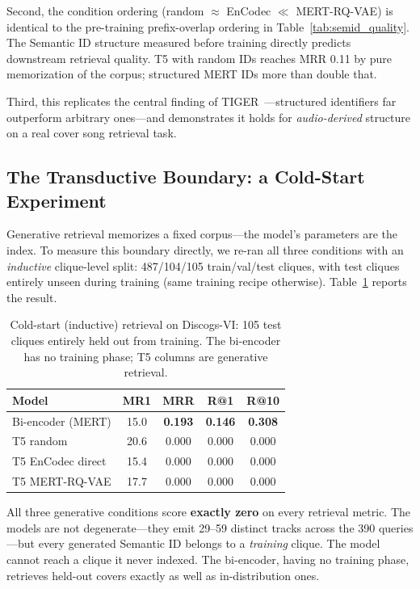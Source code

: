 \documentclass[conference]{IEEEtran}
\begin{document}
Second, the condition ordering (random $\approx$ EnCodec $\ll$ MERT-RQ-VAE) is identical to the pre-training prefix-overlap ordering in Table~\ref{tab:semid_quality}. The Semantic ID structure measured before training directly predicts downstream retrieval quality. T5 with random IDs reaches MRR 0.11 by pure memorization of the corpus; structured MERT IDs more than double that.

Third, this replicates the central finding of TIGER~\cite{rajput2023tiger}---structured identifiers far outperform arbitrary ones---and demonstrates it holds for \emph{audio-derived} structure on a real cover song retrieval task.

\subsection{The Transductive Boundary: a Cold-Start Experiment}
Generative retrieval memorizes a fixed corpus---the model's parameters are the index. To measure this boundary directly, we re-ran all three conditions with an \emph{inductive} clique-level split: 487/104/105 train/val/test cliques, with test cliques entirely unseen during training (same training recipe otherwise). Table~\ref{tab:coldstart} reports the result.

\begin{table}[t]
\caption{Cold-start (inductive) retrieval on Discogs-VI: 105 test cliques entirely held out from training. The bi-encoder has no training phase; T5 columns are generative retrieval.}
\label{tab:coldstart}
\centering
\small
\begin{tabular}{lcccc}
\toprule
Model & MR1 & MRR & R@1 & R@10 \\
\midrule
Bi-encoder (MERT)  & 15.0 & \textbf{0.193} & \textbf{0.146} & \textbf{0.308} \\
T5 random          & 20.6 & 0.000 & 0.000 & 0.000 \\
T5 EnCodec direct  & 15.4 & 0.000 & 0.000 & 0.000 \\
T5 MERT-RQ-VAE     & 17.7 & 0.000 & 0.000 & 0.000 \\
\bottomrule
\end{tabular}
\end{table}

All three generative conditions score \textbf{exactly zero} on every retrieval metric. The models are not degenerate---they emit 29--59 distinct tracks across the 390 queries---but every generated Semantic ID belongs to a \emph{training} clique. The model cannot reach a clique it never indexed. The bi-encoder, having no training phase, retrieves held-out covers exactly as well as in-distribution ones.
\end{document}
